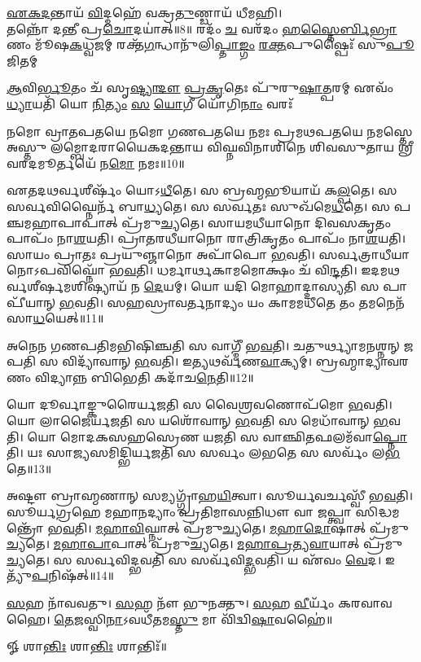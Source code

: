 {\centering
\-\ul{𑌏}\-\-\ul{𑌕}\-\-\ul{𑌦}\-𑌨𑍍𑌤𑌾𑌯᳴ \ul{𑌵𑌿}\-𑌦𑍍𑌮𑌹𑍇᳴ 𑌵𑌕𑍍𑌰\-\ul{𑌤𑍁}\-𑌣𑍍𑌡𑌾𑌯᳴ 𑌧𑍀𑌮𑌹𑌿।\\
  𑌤𑌨𑍍𑌨𑍋᳴ 𑌦𑌨𑍍𑌤𑍀 𑌪𑍍𑌰\-\ul{𑌚𑍋}\-𑌦𑌯𑌾॑𑌤𑍍॥8॥
{𑌰𑌦𑌂᳴ \ul{𑌚} 𑌵𑌰᳴𑌦𑌂 \ul{𑌹}\-\-\ul{𑌸𑍍𑌤𑍈}\-\-\ul{𑌰𑍍𑌬𑌿}\-\-\ul{𑌭𑍍𑌰𑌾}\-𑌣𑌂 𑌮𑍂᳴𑌷\-\ul{𑌕}\-𑌧𑍍𑌵𑌜𑌮𑍍}
{𑌰𑌕𑍍𑌤᳴\-\ul{𑌗}\-𑌨𑍍𑌧𑌾𑌨𑍁᳴𑌲𑌿\-\ul{𑌪𑍍𑌤𑌾}\-\-\ul{𑌙𑍍𑌗𑌂} \ul{𑌰}\-\-\ul{𑌕𑍍𑌤}\-𑌪𑍁𑌷𑍍𑌪𑍈𑌃᳴ 𑌸𑍁\-\ul{𑌪𑍂}\-𑌜𑌿𑌤𑌮𑍍}
\addtocounter{shlokacount}{8}
{\-\ul{𑌆}\-𑌵𑌿\-\ul{𑌰𑍍𑌭𑍂}\-𑌤𑌂 𑌚᳴ 𑌸𑍃\-\ul{𑌷𑍍𑌟𑍍𑌯𑌾}\-\-\ul{𑌦𑍗} \ul{𑌪𑍍𑌰}\-\-\ul{𑌕𑍃}\-𑌤𑍇𑌃 𑌪𑍁᳴𑌰𑍁\-\ul{𑌷𑌾}\-𑌤𑍍𑌪𑌰𑌮𑍍}
{𑌏𑌵𑌂᳴ \ul{𑌧𑍍𑌯𑌾}\-𑌯𑌤𑌿᳴ 𑌯𑍋 \ul{𑌨𑌿}\-\-\ul{𑌤𑍍𑌯𑌂} \ul{𑌸} \ul{𑌯𑍋}\-𑌗𑍀 𑌯𑍋᳴𑌗𑌿\-\ul{𑌨𑌾𑌂} 𑌵𑌰𑌃᳴}
}

𑌨𑌮𑍋 𑌵𑍍𑌰𑌾𑌤𑌪𑌤𑌯𑍇 𑌨𑌮𑍋 𑌗𑌣𑌪𑌤𑌯𑍇 𑌨𑌮𑌃 𑌪𑍍𑌰𑌮𑌥𑌪𑌤𑌯𑍇 𑌨𑌮𑌸𑍍𑌤𑍇 𑌅𑌸𑍍𑌤𑍁 𑌲𑌮𑍍𑌬𑍋𑌦𑌰𑌾𑌯𑍈𑌕𑌦𑌨𑍍𑌤𑌾𑌯 𑌵𑌿𑌘𑍍𑌨𑌵𑌿𑌨𑌾𑌶𑌿𑌨𑍇 𑌶𑌿𑌵𑌸𑍁𑌤𑌾𑌯 𑌶𑍍𑌰𑍀𑌵𑌰𑌦𑌮𑍂‍𑌰𑍍𑌤𑌯𑍇᳴ 𑌨\-\ul{𑌮𑍋} 𑌨𑌮𑌃॥10॥

𑌏𑌤𑌦𑌥𑌰𑍍𑌵𑌶𑍀𑌰𑍍𑌷𑌂᳴ 𑌯𑍋𑌽\-\ul{𑌧𑍀}\-𑌤𑍇। 𑌸 𑌬𑍍𑌰𑌹𑍍𑌮𑌭𑍂𑌯𑌾𑌯᳴ 𑌕\-\ul{𑌲𑍍𑌪}\-𑌤𑍇।  𑌸 𑌸𑌰𑍍𑌵𑌵𑌿𑌘𑍍𑌨𑍈𑌰𑍍𑌨᳴ 𑌬𑌾\-\ul{𑌧𑍍𑌯}\-𑌤𑍇।
𑌸 𑌸𑌰𑍍𑌵𑌤𑌃 𑌸𑍁𑌖᳴𑌮𑍇\-\ul{𑌧}\-𑌤𑍇।  𑌸 𑌪𑌞𑍍𑌚𑌮𑌹𑌾𑌪𑌾𑌪𑌾𑌤𑍍 𑌪𑍍𑌰᳴𑌮𑍁\-\ul{𑌚𑍍𑌯}\-𑌤𑍇।
𑌸𑌾𑌯𑌮𑌧𑍀𑌯𑌾𑌨𑍋 𑌦𑌿𑌵𑌸𑌕𑍃𑌤𑌂 𑌪𑌾𑌪𑌂᳴ 𑌨𑌾\-\ul{𑌶}\-𑌯𑌤𑌿।  𑌪𑍍𑌰𑌾𑌤𑌰𑌧𑍀𑌯𑌾𑌨𑍋 𑌰𑌾𑌤𑍍𑌰𑌿𑌕𑍃𑌤𑌂 𑌪𑌾𑌪𑌂᳴ 𑌨𑌾\-\ul{𑌶}\-𑌯𑌤𑌿।
𑌸𑌾𑌯𑌂 𑌪𑍍𑌰𑌾𑌤𑌃 𑌪𑍍𑌰𑌯𑍁𑌞𑍍𑌜𑌾𑌨𑍋 𑌅𑌪𑌾᳴𑌪𑍋 \ul{𑌭}\-𑌵𑌤𑌿।  𑌸𑌰𑍍𑌵𑌤𑍍𑌰𑌾𑌧𑍀𑌯𑌾𑌨𑍋𑌽𑌪𑌵𑌿𑌘𑍍𑌨𑍋᳴ 𑌭\-\ul{𑌵}\-𑌤𑌿।
𑌧𑌰𑍍𑌮𑌾𑌰𑍍𑌥𑌕𑌾𑌮𑌮𑍋𑌕𑍍𑌷𑌂 𑌚᳴ 𑌵𑌿\-\ul{𑌨𑍍𑌦}\-𑌤𑌿। 𑌇𑌦𑌮𑌥𑌰𑍍𑌵𑌶𑍀𑌰𑍍𑌷𑌮𑌶𑌿𑌷𑍍𑌯𑌾𑌯᳴ 𑌨 \ul{𑌦𑍇}\-𑌯𑌮𑍍।  𑌯𑍋 𑌯𑌦𑌿 𑌮𑍋𑌹𑌾𑌦𑍍𑌦𑌾𑌸𑍍𑌯𑌤𑌿 𑌸 𑌪𑌾𑌪𑍀᳴𑌯𑌾𑌨𑍍 \ul{𑌭}\-𑌵𑌤𑌿।
𑌸𑌹𑌸𑍍𑌰𑌾𑌵𑌰𑍍𑌤𑌨𑌾𑌦𑍍𑌯𑌂 𑌯𑌂 𑌕𑌾𑌮𑌮𑌧𑍀𑌤𑍇 𑌤𑌂 𑌤𑌮𑌨𑍇𑌨᳴ 𑌸𑌾\-\ul{𑌧}\-𑌯𑍇𑌤𑍍॥11॥

𑌅𑌨𑍇𑌨 𑌗𑌣𑌪𑌤𑌿𑌮𑌭𑌿𑌷𑌿𑌞𑍍𑌚𑌤𑌿 𑌸 𑌵𑌾𑌗𑍍𑌮𑍀᳴ 𑌭\-\ul{𑌵}\-𑌤𑌿।  𑌚𑌤𑍁𑌰𑍍𑌥𑍍𑌯𑌾𑌮𑌨𑌶𑍍𑌨𑌨𑍍 𑌜𑌪𑌤𑌿 𑌸 𑌵𑌿𑌦𑍍𑌯𑌾᳴𑌵𑌾𑌨𑍍 \ul{𑌭}\-𑌵𑌤𑌿।  𑌇𑌤𑍍𑌯𑌥𑌰𑍍𑌵᳴𑌣\-\ul{𑌵𑌾}\-𑌕𑍍𑌯𑌮𑍍। 𑌬𑍍𑌰𑌹𑍍𑌮𑌾𑌦𑍍𑌯𑌾𑌵𑌰𑌣𑌂 𑌵𑌿𑌦𑍍𑌯𑌾𑌨𑍍𑌨 𑌬𑌿𑌭𑍇𑌤𑌿 𑌕𑌦𑌾᳴𑌚\-\ul{𑌨𑍇}\-𑌤𑌿॥12॥

𑌯𑍋 𑌦𑍂𑌰𑍍𑌵𑌾𑌙𑍍𑌕𑍁𑌰𑍈𑌰𑍍𑌯𑌜𑌤𑌿 𑌸 𑌵𑍈𑌶𑍍𑌰𑌵𑌣𑍋𑌪᳴𑌮𑍋 \ul{𑌭}\-𑌵𑌤𑌿। 𑌯𑍋 𑌲𑌾𑌜𑍈𑌰𑍍𑌯𑌜𑌤𑌿 𑌸 𑌯𑌶𑍋᳴𑌵𑌾𑌨𑍍 \ul{𑌭}\-𑌵𑌤𑌿 𑌸 𑌮𑍇𑌧𑌾᳴𑌵𑌾𑌨𑍍 \ul{𑌭}\-𑌵𑌤𑌿। 
𑌯𑍋 𑌮𑍋𑌦𑌕𑌸𑌹𑌸𑍍𑌰𑍇𑌣 𑌯𑌜𑌤𑌿 𑌸 𑌵𑌾𑌞𑍍𑌛𑌿𑌤𑌫𑌲𑌮᳴𑌵𑌾\-\ul{𑌪𑍍𑌨𑍋}\-𑌤𑌿। 𑌯𑌃 𑌸𑌾𑌜𑍍𑌯𑌸𑌮𑌿𑌦𑍍𑌭𑌿𑌰𑍍𑌯𑌜𑌤𑌿 𑌸 𑌸𑌰𑍍𑌵𑌂 𑌲𑌭𑌤𑍇 𑌸 𑌸𑌰𑍍𑌵𑌂᳴ 𑌲\-\ul{𑌭}\-𑌤𑍇॥13॥

𑌅𑌷𑍍𑌟𑍗 𑌬𑍍𑌰𑌾𑌹𑍍𑌮𑌣𑌾𑌨𑍍 𑌸𑌮𑍍𑌯𑌗𑍍𑌗𑍍𑌰𑌾᳴𑌹\-\ul{𑌯𑌿}\-𑌤𑍍𑌵𑌾। 𑌸𑍂𑌰𑍍𑌯𑌵𑌰𑍍𑌚𑌸𑍍𑌵𑍀᳴ 𑌭\-\ul{𑌵}\-𑌤𑌿।
𑌸𑍂𑌰𑍍𑌯𑌗𑍍𑌰𑌹𑍇 𑌮𑌹𑌾𑌨𑌦𑍍𑌯𑌾𑌂 𑌪𑍍𑌰𑌤𑌿𑌮𑌾𑌸𑌨𑍍𑌨𑌿𑌧𑍗 𑌵𑌾 𑌜𑌪𑍍𑌤𑍍𑌵𑌾 𑌸𑌿𑌦𑍍𑌧𑌮𑌨𑍍𑌤𑍍𑌰𑍋᳴ 𑌭\-\ul{𑌵}\-𑌤𑌿।
\-\ul{𑌮}\-\-\ul{𑌹𑌾}\-\-\ul{𑌵𑌿}\-𑌘𑍍𑌨𑌾𑌤𑍍 𑌪𑍍𑌰᳴𑌮𑍁\-\ul{𑌚𑍍𑌯}\-𑌤𑍇।  \ul{𑌮}\-\-\ul{𑌹𑌾}\-\-\ul{𑌦𑍋}\-𑌷𑌾𑌤𑍍 𑌪𑍍𑌰᳴𑌮𑍁\-\ul{𑌚𑍍𑌯}\-𑌤𑍇। \ul{𑌮}\-\-\ul{𑌹𑌾}\-\-\ul{𑌪𑌾}\-𑌪𑌾𑌤𑍍 𑌪𑍍𑌰᳴𑌮𑍁\-\ul{𑌚𑍍𑌯}\-𑌤𑍇।
\-\ul{𑌮}\-\-\ul{𑌹𑌾}\-\-\ul{𑌪𑍍𑌰}\-\-\ul{𑌤𑍍𑌯}\-\-\ul{𑌵𑌾}\-𑌯𑌾𑌤𑍍 𑌪𑍍𑌰᳴𑌮𑍁\-\ul{𑌚𑍍𑌯}\-𑌤𑍇। 𑌸 𑌸𑌰𑍍𑌵𑌵𑌿𑌦𑍍𑌭𑌵𑌤𑌿 𑌸 𑌸𑌰𑍍𑌵᳴𑌵𑌿\-\ul{𑌦𑍍𑌭}\-𑌵𑌤𑌿। 𑌯 𑌏᳴𑌵𑌂 \ul{𑌵𑍇}\-𑌦।  𑌇𑌤𑍍𑌯𑍁᳴\-\ul{𑌪}\-𑌨𑌿𑌷᳴𑌤𑍍॥14॥

\-\ul{𑌸}\-𑌹 𑌨𑌾᳴𑌵𑌵𑌤𑍁। \ul{𑌸}\-𑌹 𑌨𑍗᳴ 𑌭𑍁𑌨𑌕𑍍𑌤𑍁। \ul{𑌸}\-𑌹 \ul{𑌵𑍀}\-𑌰𑍍𑌯𑌂᳴ 𑌕𑌰𑌵𑌾𑌵𑌹𑍈।
\-\ul{𑌤𑍇}\-\-\ul{𑌜}\-𑌸𑍍𑌵𑌿\-\ul{𑌨𑌾}\-𑌽𑌵𑌧𑍀᳴𑌤𑌮\-\ul{𑌸𑍍𑌤𑍁} 𑌮𑌾 𑌵𑌿᳴𑌦𑍍𑌵𑌿\-\ul{𑌷𑌾}\-𑌵𑌹𑍈॑॥

\centerline{𑍐 𑌶𑌾\-\ul{𑌨𑍍𑌤𑌿𑌃} 𑌶𑌾\-\ul{𑌨𑍍𑌤𑌿𑌃} 𑌶𑌾𑌨𑍍𑌤𑌿𑌃᳴॥}
